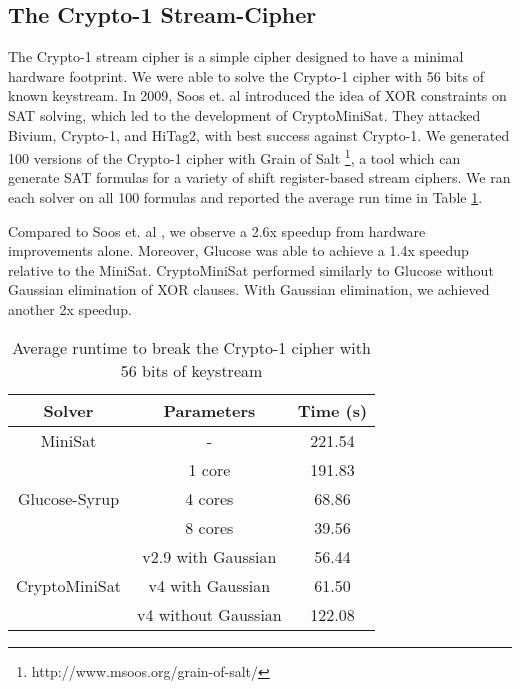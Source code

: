 \subsection{The Crypto-1 Stream-Cipher}
The Crypto-1 stream cipher is a simple cipher designed to have a minimal hardware footprint. We were able to solve the Crypto-1 cipher with 56 bits of known keystream. In 2009, Soos et. al \cite{SNC09} introduced the idea of XOR constraints on SAT solving, which led to the development of CryptoMiniSat. They attacked Bivium, Crypto-1, and HiTag2, with best success against Crypto-1. We generated 100 versions of the Crypto-1 cipher with Grain of Salt \footnote{http://www.msoos.org/grain-of-salt/}, a tool which can generate SAT formulas for a variety of shift register-based stream ciphers. We ran each solver on all 100 formulas and reported the average run time in Table \ref{table:crypto1:runtime}.

Compared to Soos et. al \cite{SNC09}, we observe a 2.6x speedup from hardware improvements alone. Moreover, Glucose was able to achieve a 1.4x speedup relative to the MiniSat. CryptoMiniSat performed similarly to Glucose without Gaussian elimination of XOR clauses. With Gaussian elimination, we achieved another 2x speedup. 

\begin{table}[!htbp]
	\centering
	\begin{tabular}{|c|c|c|}
		\hline
		\textbf{Solver} & \textbf{Parameters} & \textbf{Time (s)} \\
		\hline
		MiniSat & - & 221.54 \\
		\hline
		\multirow{3}{*}{Glucose-Syrup} & 1 core & 191.83 \\ \cline{2-3}
		& 4 cores & 68.86 \\ \cline{2-3}
		& 8 cores & 39.56 \\
		\hline
		
		\multirow{3}{*}{CryptoMiniSat} & v2.9 with Gaussian & 56.44 \\ \cline{2-3}
		& v4 with Gaussian & 61.50 \\ \cline{2-3}
		& v4 without Gaussian & 122.08 \\
		\hline
	\end{tabular}
	
	\caption{Average runtime to break the Crypto-1 cipher with 56 bits of keystream}
	\label{table:crypto1:runtime}
\end{table}